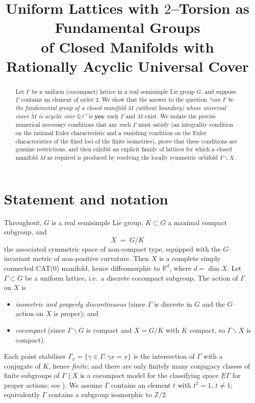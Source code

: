 \documentclass[12pt]{article}
\title{Uniform Lattices with $2$--Torsion as Fundamental Groups\\
of Closed Manifolds with Rationally Acyclic Universal Cover}
\author{}
\date{}
\newcommand{\bR}{\mathbb{R}}
\newcommand{\bQ}{\mathbb{Q}}
\newcommand{\bZ}{\mathbb{Z}}
\theoremstyle{definition}
\begin{document}
\maketitle

\begin{abstract}
Let $\Gamma$ be a uniform (cocompact) lattice in a real semisimple Lie group $G$,
and suppose $\Gamma$ contains an element of order $2$.  We show that the answer
to the question
\emph{``can $\Gamma$ be the fundamental group of a closed manifold $M$ (without
boundary) whose universal cover $\widetilde M$ is acyclic over $\bQ$?''}
is \textbf{yes}: such $\Gamma$ and $M$ exist.  We isolate the precise numerical
necessary conditions that any such $\Gamma$ must satisfy (an integrality
condition on the rational Euler characteristic and a vanishing condition on the
Euler characteristics of the fixed loci of the finite isometries), prove that
these conditions are genuine restrictions, and then exhibit an explicit family of
lattices for which a closed manifold $M$ as required is produced by resolving the
locally symmetric orbifold $\Gamma\backslash X$.
\end{abstract}

\section{Statement and notation}

Throughout, $G$ is a real semisimple Lie group, $K\subset G$ a maximal compact
subgroup, and
\[
   X \;=\; G/K
\]
the associated symmetric space of non-compact type, equipped with the
$G$--invariant metric of non-positive curvature.  Then $X$ is a complete simply
connected CAT($0$) manifold, hence diffeomorphic to $\bR^{d}$, where
$d=\dim X$.  Let $\Gamma\subset G$ be a uniform lattice, i.e.\ a discrete
cocompact subgroup.  The action of $\Gamma$ on $X$ is

\begin{itemize}
\item \emph{isometric and properly discontinuous} (since $\Gamma$ is discrete in
$G$ and the $G$--action on $X$ is proper); and
\item \emph{cocompact} (since $\Gamma\backslash G$ is compact and
$X=G/K$ with $K$ compact, so $\Gamma\backslash X$ is compact).
\end{itemize}
Each point stabiliser $\Gamma_x=\{\gamma\in\Gamma:\gamma x=x\}$ is the
intersection of $\Gamma$ with a conjugate of $K$, hence \emph{finite}; and there
are only finitely many conjugacy classes of finite subgroups of $\Gamma$
(\,$X$ is a cocompact model for the classifying space $\underline E\Gamma$ for
proper actions; see \cite[\S2]{Lueck}).  We assume $\Gamma$ contains an element
$t$ with $t^2=1$, $t\neq 1$; equivalently $\Gamma$ contains a subgroup isomorphic
to $\bZ/2$.
\end{document}
